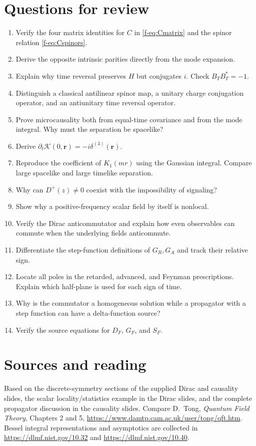 \documentclass[11pt]{article}
\begin{document}
\section*{Questions for review}
\begin{enumerate}
\item Verify the four matrix identities for \(C\) in \eqref{f-eq:Cmatrix} and
the spinor relation \eqref{f-eq:Cspinors}.
\item Derive the opposite intrinsic parities directly from the mode expansion.
\item Explain why time reversal preserves \(H\) but conjugates \(i\).
Check \(B_TB_T^*=-1\).
\item Distinguish a classical antilinear spinor map, a unitary charge
conjugation operator, and an antiunitary time reversal operator.
\item Prove microcausality both from equal-time covariance and from the
mode integral. Why must the separation be spacelike?
\item Derive \(\partial_t\mathcal K(0,\bm r)=-i\delta^{(3)}(\bm r)\).
\item Reproduce the coefficient of \(K_1(mr)\) using the Gaussian integral.
Compare large spacelike and large timelike separation.
\item Why can \(D^+(z)\neq0\) coexist with the impossibility of signaling?
\item Show why a positive-frequency scalar field by itself is nonlocal.
\item Verify the Dirac anticommutator and explain how even observables
can commute when the underlying fields anticommute.
\item Differentiate the step-function definitions of \(G_R,G_A\) and
track their relative sign.
\item Locate all poles in the retarded, advanced, and Feynman prescriptions.
Explain which half-plane is used for each sign of time.
\item Why is the commutator a homogeneous solution while a propagator
with a step function can have a delta-function source?
\item Verify the source equations for \(D_F\), \(G_F\), and \(S_F\).
\end{enumerate}

\section*{Sources and reading}
Based on the discrete-symmetry sections of the supplied Dirac and
causality slides, the scalar locality/statistics example in the Dirac
slides, and the complete propagator discussion in the causality slides.
Compare D.~Tong, \emph{Quantum Field Theory}, Chapters 2 and 5,
\url{https://www.damtp.cam.ac.uk/user/tong/qft.htm}.
Bessel integral representations and asymptotics are collected in
\url{https://dlmf.nist.gov/10.32} and \url{https://dlmf.nist.gov/10.40}.
\end{document}
